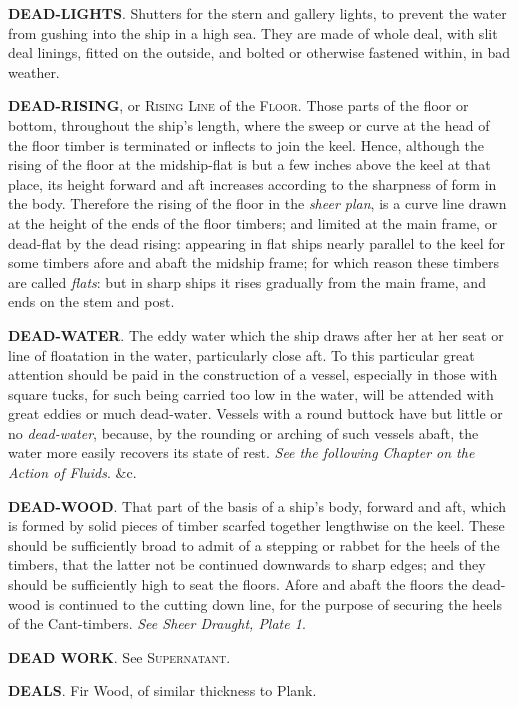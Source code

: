 \textbf{DEAD-LIGHTS}. Shutters for the stern and gallery lights, to prevent the water from gushing into the ship in a high sea. They are made of whole deal, with slit deal linings, fitted on the outside, and bolted or otherwise fastened within, in bad weather.

\textbf{DEAD-RISING}, or \textsc{Rising Line} of the \textsc{Floor}. Those parts of the floor or bottom, throughout the ship's length, where the sweep or curve at the head of the floor timber is terminated or inflects to join the keel. Hence, although the rising of the floor at the midship-flat is but a few inches above the keel at that place, its height forward and aft increases according to the sharpness of form in the body. Therefore the rising of the floor in the \textit{sheer plan}, is a curve line drawn at the height of the ends of the floor timbers; and limited at the main frame, or dead-flat by the dead rising: appearing in flat ships nearly parallel to the keel for some timbers afore and abaft the midship frame; for which reason these timbers are called \textit{flats}: but in sharp ships it rises gradually from the main frame, and ends on the stem and post. 

\textbf{DEAD-WATER}. The eddy water which the ship draws after her at her seat or line of floatation in the water, particularly close aft. To this particular great attention should be paid in the construction of a vessel, especially in those with square tucks, for such being carried too low in the water, will be attended with great eddies or much dead-water. Vessels with a round buttock have but little or no \textit{dead-water}, because, by the rounding or arching of such vessels abaft, the water more easily recovers its state of rest. \textit{See the following Chapter on the Action of Fluids}. \&c.

\textbf{DEAD-WOOD}. That part of the basis of a ship's body, forward and aft, which is formed by solid pieces of timber scarfed together lengthwise on the keel. These should be sufficiently broad to admit of a stepping or rabbet for the heels of the timbers, that the latter not be continued downwards to sharp edges; and they should be sufficiently high to seat the floors. Afore and abaft the floors the dead-wood is continued to the cutting down line, for the purpose of securing the heels of the Cant-timbers. \textit{See Sheer Draught, Plate 1}. 

\textbf{DEAD WORK}. See \textsc{Supernatant}. 

\textbf{DEALS}. Fir Wood, of similar thickness to Plank. 

